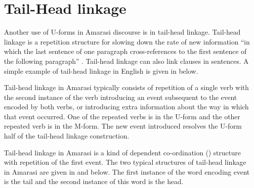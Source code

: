 \section{Tail-Head linkage}\label{sec:TaiHeaLin}
Another use of U-forms in Amarasi discourse is in tail-head linkage.
Tail-head linkage is a repetition structure for slowing down the rate of new information
``in which the last sentence of one paragraph cross-references to the first sentence 
of the following paragraph'' \citep[9]{lo83}.
Tail-head linkage can also link clauses in sentences.
A simple example of tail-head linkage in English is given in  below.

\begin{exe}\let\eachwordone=\p
	\label{ex:TaiHeEng}
\end{exe}

Tail-head linkage in Amarasi typically consists of repetition of a single
verb with the second instance of the verb introducing an event subsequent
to the event encoded by both verbs,
or introducing extra information about the way in which that event occurred.
One of the repeated verbs is in the U-form and the other
repeated verb is in the M-form.
The new event introduced resolves the U-form half of the tail-head linkage construction.

Tail-head linkage in Amarasi is a kind of dependent
co-ordination () structure with repetition of the first event.
The two typical structures of tail-head linkage in Amarasi
are given in  and  below.
The first instance of the word encoding event is the tail
and the second instance of this word is the head.

\begin{exe}
	\label{ex:THL}
	\label{ex:THL2}
\end{exe}

